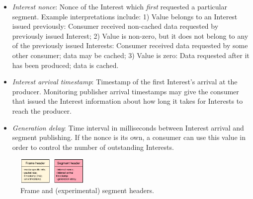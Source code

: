 \documentclass{icn/sig-alternate-2013} %
\begin{document}
\begin{itemize} [label={}]
\item \textit{Interest nonce}: Nonce of the Interest which \textit{first} requested a particular segment. Example interpretations include: 1) Value belongs to an Interest issued previously: Consumer received non-cached data requested by previously issued Interest; 2) Value is non-zero, but it does not belong to any of the previously issued Interests: Consumer received data requested by some other consumer; data may be cached; 3) Value is zero: Data requested after it has been produced; data is cached.
\item \textit{Interest arrival timestamp}: Timestamp of the first Interest's arrival at the producer. Monitoring publisher arrival timestamps may give the consumer that issued the Interest information about how long it takes for Interests to reach the producer. %
\item \textit{Generation delay}: Time interval in milliseconds between Interest arrival and segment publishing. If the nonce is its own, a consumer can use this value in order to control the number of outstanding Interests. %
\end{itemize}



%

%


\begin{figure}[t!]
\centering
\includegraphics[width=0.3\textwidth]{data-struct}
\vspace{-4pt}
\caption{Frame and (experimental) segment headers.}
\label{fig:data-struct}
\end{figure}
\end{document}
